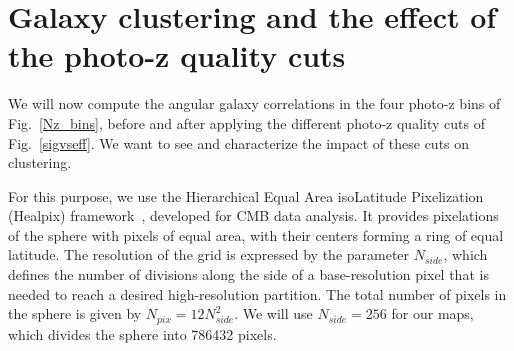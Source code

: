 \section{Galaxy clustering and the effect of the photo-z quality cuts}
\label{sec:clustering}

We will now compute the angular galaxy correlations in the four photo-z bins of Fig.~\ref{Nz_bins}, before and after applying the different photo-z quality cuts of Fig.~\ref{sigvseff}. We want to see and characterize the impact of these cuts on clustering.

For this purpose, we use the Hierarchical Equal Area isoLatitude Pixelization (Healpix) framework~\citep{Gorski2005}, developed for CMB data analysis. It provides pixelations of the sphere with pixels of equal area, with their centers forming a ring of equal latitude. The resolution of the grid is expressed by the parameter $N_{side}$, which defines the number of divisions along the side of a base-resolution pixel that is needed to reach a desired high-resolution partition. The total number of pixels in the sphere is given by $N_{pix} = 12 N_{side}^2$. We will use $N_{side} = 256$ for our maps, which divides the sphere into 786432 pixels. 


